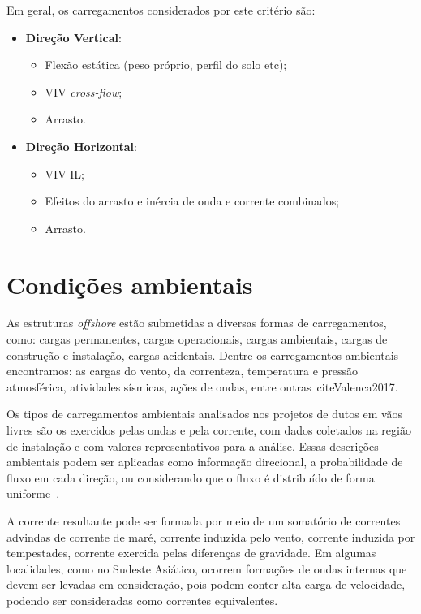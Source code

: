 Em geral, os carregamentos considerados por este critério são:
\begin{itemize}
	\item \textbf{Direção Vertical}:
	\begin{itemize}
		\item Flexão estática (peso próprio, perfil do solo etc);
		\item VIV \textit{cross-flow};
		\item Arrasto.
	\end{itemize}
	\item \textbf{Direção Horizontal}:
	\begin{itemize}
		\item VIV IL;
		\item Efeitos do arrasto e inércia de onda e corrente combinados;
		\item Arrasto.
	\end{itemize}
\end{itemize}


\section{Condições ambientais}
\label{sec:condicoes-ambientais}

As estruturas \textit{offshore} estão submetidas a diversas formas de carregamentos, como: cargas permanentes, cargas operacionais, cargas ambientais, cargas de construção e instalação, cargas acidentais.
Dentre os carregamentos ambientais encontramos: as cargas do vento, da correnteza, temperatura e pressão atmosférica, atividades sísmicas, ações de ondas, entre outras~cite{Valenca2017}.

Os tipos de carregamentos ambientais analisados nos projetos de dutos em vãos livres são os exercidos pelas ondas e pela corrente, com dados coletados na região de instalação e com valores representativos para a análise.
Essas descrições ambientais podem ser aplicadas como informação direcional, a probabilidade de fluxo em cada direção, ou considerando que o fluxo é distribuído de forma uniforme~\cite{DNV2017}.

A corrente resultante pode ser formada por meio de um somatório de correntes advindas de corrente de maré, corrente induzida pelo vento, corrente induzida por tempestades, corrente exercida pelas diferenças de gravidade.
Em algumas localidades, como no Sudeste Asiático, ocorrem formações de ondas internas que devem ser levadas em consideração, pois podem conter alta carga de velocidade, podendo ser consideradas como correntes equivalentes.

